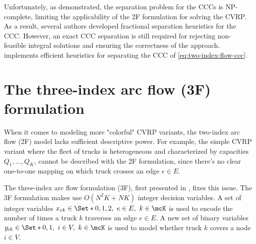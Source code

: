 Unfortunately, as \textcite{augerat1995} demonstrated,
the separation problem for the CCCs is NP-complete,
limiting the applicability of the 2F formulation for solving the CVRP.
As a result, several authors \parencite{augerat1995, augerat1998, ralphs2003}
developed fractional separation heuristics for the CCC.
However,
an exact CCC separation is still required
for rejecting non-feasible integral solutions
and ensuring the correctness of the approach.
\textcite{lysgaard2003cvrpsep} implements efficient
heuristics for separating the CCC of \cref{eq:two-index-flow-ccc}.

\section{The three-index arc flow (3F) formulation}
\label{sec:cvrp-three-index-flow-formulation}

When it comes to modeling more "colorful" CVRP variants,
the two-index arc flow (2F) model lacks sufficient descriptive power.
For example,
the simple CVRP variant where the fleet of trucks is heterogeneous
and characterized by capacities $Q_1, \dots, Q_K$,
cannot be described with the 2F formulation,
since there's no clear one-to-one mapping on which truck crosses an edge $e \in E$.

The three-index arc flow formulation (3F),
first presented in \textcite{golden1977},
fixes this issue.
The 3F formulation makes use $O(N^2 K + N K)$ integer decision variables.
A set of integer variables $x_{ek} \in \Set*{0, 1, 2},\ e \in E,\ k \in \mcK$
is used to encode the number of times a truck $k$ traverses an edge $e \in E$.
A new set of binary variables $y_{ik} \in \Set*{0, 1},\ i \in V,\ k \in \mcK$
is used to model whether truck $k$ covers a node $i \in V$.

